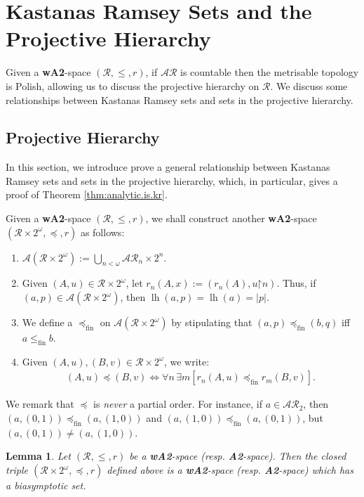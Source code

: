 \documentclass[11pt,reqno]{amsart}
\theoremstyle{plain}
\numberwithin{equation}{section}
\newtheorem{lemma}[theorem]{Lemma}
\theoremstyle{definition}
\newcommand{\func}{\operatorname}
\newcommand{\cal}{\mathcal}
\newcommand{\restrictedto}{\mathord{\upharpoonright}}
\newcommand{\lh}{\func{lh}}
\newcommand{\fin}{\mathrm{fin}}
\begin{document}
\section{Kastanas Ramsey Sets and the Projective Hierarchy}
Given a \textbf{wA2}-space $(\cal{R},\leq,r)$, if $\cal{AR}$ is countable then the metrisable topology is Polish, allowing us to discuss the projective hierarchy on $\cal{R}$. We discuss some relationships between Kastanas Ramsey sets and sets in the projective hierarchy.

\subsection{Projective Hierarchy} In this section, we introduce prove a general relationship between Kastanas Ramsey sets and sets in the projective hierarchy, which, in particular, gives a proof of Theorem \ref{thm:analytic.is.kr}.

Given a \textbf{wA2}-space $(\cal{R},\leq,r)$, we shall construct another \textbf{wA2}-space $(\cal{R} \times 2^\omega,\preceq,r)$ as follows:
\begin{enumerate}
    \item $\cal{A}(\cal{R} \times 2^\omega) := \bigcup_{n<\omega} \cal{AR}_n \times 2^n$.

    \item Given $(A,u) \in \cal{R} \times 2^\omega$, let $r_n(A,x) := (r_n(A),u\restrictedto n)$. Thus, if $(a,p) \in \cal{A}(\cal{R} \times 2^\omega)$, then $\lh(a,p) = \lh(a) = |p|$.

    \item We define a $\preceq_\fin$ on $\cal{A}(\cal{R} \times 2^\omega)$ by stipulating that $(a,p) \preceq_\fin (b,q)$ iff $a \leq_\fin b$. 

    \item Given $(A,u),(B,v) \in \cal{R} \times 2^\omega$, we write:
    \begin{align*}
        (A,u) \preceq (B,v) \iff \forall n \, \exists m[r_n(A,u) \preceq_\fin r_m(B,v)].
    \end{align*}
\end{enumerate}

We remark that $\preceq$ is \emph{never} a partial order. For instance, if $a \in \cal{AR}_2$, then $(a,(0,1)) \preceq_\fin (a,(1,0))$ and $(a,(1,0)) \preceq_\fin (a,(0,1))$, but $(a,(0,1)) \neq (a,(1,0))$.

\begin{lemma}
    Let $(\cal{R},\leq,r)$ be a \textbf{wA2}-space (resp. \textbf{A2}-space). Then the closed triple $(\cal{R} \times 2^\omega,\preceq,r)$ defined above is a \textbf{wA2}-space (resp. \textbf{A2}-space) which has a biasymptotic set.
\end{lemma}
\end{document}
